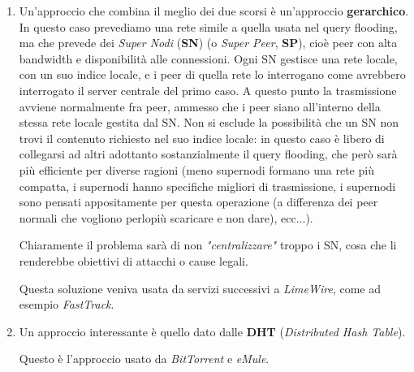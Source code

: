 \documentclass[a4paper,11pt]{article}
\begin{document}
\begin{enumerate}
	\item Un'approccio che combina il meglio dei due scorsi è un'approccio \textbf{gerarchico}.
		In questo caso prevediamo una rete simile a quella usata nel query flooding, ma che prevede dei \textit{Super Nodi} (\textbf{SN}) (o \textit{Super Peer}, \textbf{SP}), cioè peer con alta bandwidth e disponibilità alle connessioni.
		Ogni SN gestisce una rete locale, con un suo indice locale, e i peer di quella rete lo interrogano come avrebbero interrogato il server centrale del primo caso.
		A questo punto la trasmissione avviene normalmente fra peer, ammesso che i peer siano all'interno della stessa rete locale gestita dal SN.
		Non si esclude la possibilità che un SN non trovi il contenuto richiesto nel suo indice locale: in questo caso è libero di collegarsi ad altri adottanto sostanzialmente il query flooding, che però sarà più efficiente per diverse ragioni (meno supernodi formano una rete più compatta, i supernodi hanno specifiche migliori di trasmissione, i supernodi sono pensati appositamente per questa operazione (a differenza dei peer normali che vogliono perlopiù scaricare e non dare), ecc...).

		Chiaramente il problema sarà di non \textit{"centralizzare"} troppo i SN, cosa che li renderebbe obiettivi di attacchi o cause legali.

		Questa soluzione veniva usata da servizi successivi a \textit{LimeWire}, come ad esempio \textit{FastTrack}.

	\item Un approccio interessante è quello dato dalle \textbf{DHT} (\textit{Distributed Hash Table}).
		
		Questo è l'approccio usato da \textit{BitTorrent} e \textit{eMule}.
\end{enumerate}
\end{document}
